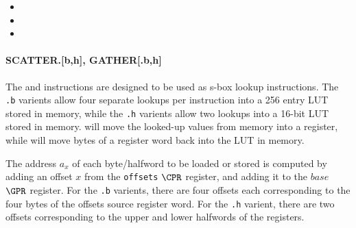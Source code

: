 \begin{itemize}
\item {}
\item {}
\item {}
\end{itemize}


\paragraph{SCATTER.[b,h], GATHER[.b,h]}

The  and  instructions are designed to be used as
s-box lookup instructions. The {\tt .b} varients allow four separate lookups
per instruction into a 256 entry LUT stored in memory, while the {\tt .h}
varients allow two lookups into a 16-bit LUT stored in memory. 
will move the looked-up values from memory into a register, while 
will move bytes of a register word back into the LUT in memory.

The address $a_x$ of each byte/halfword to be loaded or stored is computed by
adding an offset $x$ from the {\tt offsets} $\CPR$ register, and adding it
to the $base$ $\GPR$ register. For the {\tt .b} varients, there are four
offsets each corresponding to the four bytes of the offsets source register
word. For the {\tt .h} varient, there are two offsets corresponding to the
upper and lower halfwords of the registers.

